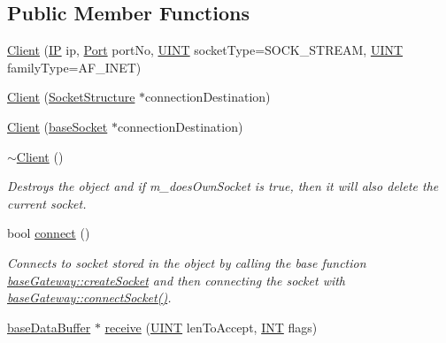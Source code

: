 \subsection*{Public Member Functions}
\begin{DoxyCompactItemize}
\item 
\hyperlink{class_communication_1_1_client_aea201d12c91899407f6b1a8f996d548d}{Client} (\hyperlink{class_communication_1_1_i_p}{I\+P} ip, \hyperlink{class_communication_1_1_port}{Port} port\+No, \hyperlink{typedefs_8h_a2e2c38961834f28c06e17e074eb00bc7}{U\+I\+N\+T} socket\+Type=S\+O\+C\+K\+\_\+\+S\+T\+R\+E\+A\+M, \hyperlink{typedefs_8h_a2e2c38961834f28c06e17e074eb00bc7}{U\+I\+N\+T} family\+Type=A\+F\+\_\+\+I\+N\+E\+T)
\item 
\hyperlink{class_communication_1_1_client_ac607567232a2f4f2f0e2c6f643259d95}{Client} (\hyperlink{class_communication_1_1_socket_structure}{Socket\+Structure} $\ast$connection\+Destination)
\item 
\hyperlink{class_communication_1_1_client_ae2cfc25664ab90a303a9e687a47c15f5}{Client} (\hyperlink{class_communication_1_1base_socket}{base\+Socket} $\ast$connection\+Destination)
\item 
\hyperlink{class_communication_1_1_client_a77c290beabfe76ea97a9027d66a04f7c}{$\sim$\+Client} ()
\begin{DoxyCompactList}\small\item\em Destroys the object and if m\+\_\+does\+Own\+Socket is true, then it will also delete the current socket. \end{DoxyCompactList}\item 
bool \hyperlink{class_communication_1_1_client_a0fa54f72440e34d7659d6289ce4219d5}{connect} ()
\begin{DoxyCompactList}\small\item\em Connects to socket stored in the object by calling the base function \hyperlink{class_communication_1_1base_gateway_a47e8f182fca56a7658f94e8b173d63f2}{base\+Gateway\+::create\+Socket} and then connecting the socket with \hyperlink{class_communication_1_1base_gateway_a3118d268cf632aefe2ce05daa71bcc86}{base\+Gateway\+::connect\+Socket()}. \end{DoxyCompactList}\item 
\hyperlink{class_communication_1_1base_data_buffer}{base\+Data\+Buffer} $\ast$ \hyperlink{class_communication_1_1_client_aa28b2b8434ac7d76b9aaa6c4b951d3be}{receive} (\hyperlink{typedefs_8h_a2e2c38961834f28c06e17e074eb00bc7}{U\+I\+N\+T} len\+To\+Accept, \hyperlink{typedefs_8h_a0240b856f74f8905ed334a5a0ca624e5}{I\+N\+T} flags)

\end{DoxyCompactItemize}
